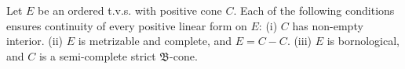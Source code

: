Let $E$ be an ordered t.v.s. with positive cone $C$. Each of the following conditions ensures continuity of every positive linear form on $E$: (i) $C$ has non-empty interior. (ii) $E$ is metrizable and complete, and $E = C - C$. (iii) $E$ is bornological, and $C$ is a semi-complete strict $\mathfrak{B}$-cone.
